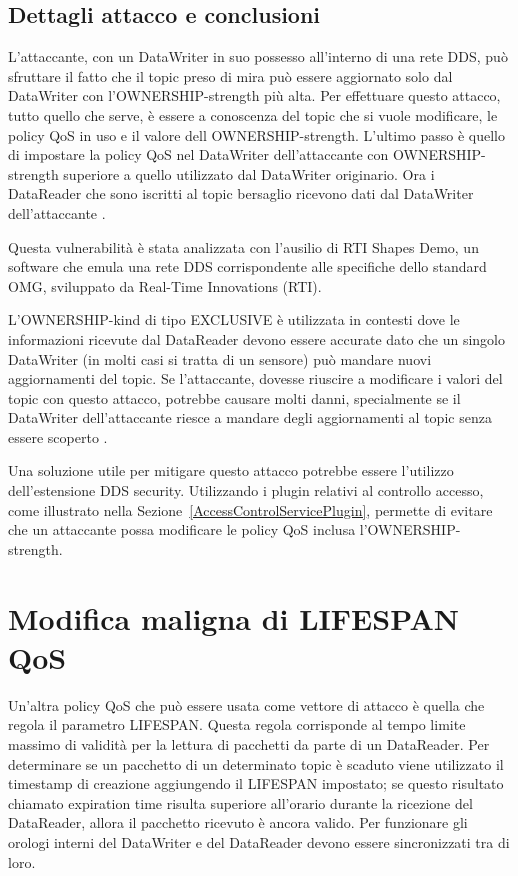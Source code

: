 \subsection{Dettagli attacco e conclusioni}
L'attaccante, con un DataWriter in suo possesso all'interno di una rete DDS,
può sfruttare il fatto che il topic preso di mira può essere aggiornato
solo dal DataWriter con l'OWNERSHIP-strength più alta.
Per effettuare questo attacco, tutto quello che serve, è 
essere a conoscenza del topic che
si vuole modificare, le policy QoS in uso e il valore dell OWNERSHIP-strength.
L'ultimo passo è quello di impostare la policy QoS nel DataWriter
dell'attaccante con OWNERSHIP-strength superiore a quello utilizzato dal
DataWriter originario.
Ora i DataReader che sono iscritti al topic bersaglio
ricevono dati dal DataWriter dell'attaccante
\cite{DBLP:conf/malware/MichaudDL18}.


Questa vulnerabilità è stata analizzata con l'ausilio di RTI Shapes Demo, un 
software che emula una rete DDS corrispondente alle specifiche 
dello standard OMG, sviluppato da Real-Time Innovations (RTI).

L'OWNERSHIP-kind di tipo EXCLUSIVE è utilizzata in contesti dove le
informazioni ricevute dal DataReader devono essere accurate dato che un singolo
DataWriter (in molti casi si tratta di un sensore) può mandare nuovi aggiornamenti
del topic. Se l'attaccante, dovesse riuscire a modificare i valori del topic con
questo attacco, potrebbe causare molti danni,
specialmente se il DataWriter dell'attaccante riesce a mandare degli aggiornamenti
al topic senza essere scoperto
\cite{DBLP:conf/malware/MichaudDL18}.

Una soluzione utile per mitigare questo attacco potrebbe essere l'utilizzo
dell'estensione DDS security. Utilizzando i plugin relativi al controllo accesso,
come illustrato nella Sezione~\ref{AccessControlServicePlugin}, permette
di evitare che un attaccante possa modificare le policy QoS inclusa 
l'OWNERSHIP-strength.


\section{Modifica maligna di LIFESPAN QoS}

Un'altra policy QoS che può essere usata come vettore di attacco è quella
che regola il parametro LIFESPAN. Questa regola corrisponde al tempo limite massimo 
di validità per la
lettura di pacchetti da parte di un DataReader. Per determinare se un pacchetto
di un determinato topic è scaduto viene utilizzato il timestamp di creazione
aggiungendo il LIFESPAN impostato; se questo risultato chiamato 
expiration time risulta
superiore all'orario durante la ricezione del DataReader, allora il pacchetto
ricevuto è ancora valido. 
Per funzionare gli orologi interni del DataWriter e del DataReader
devono essere sincronizzati tra di loro.

